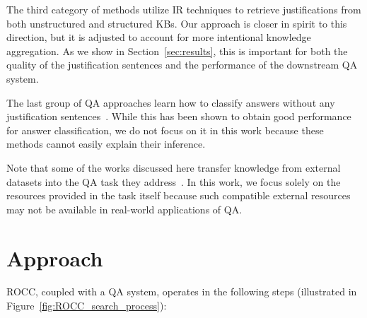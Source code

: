 The third category of methods utilize IR techniques to retrieve justifications from both unstructured \cite{yadav_AHE} and structured \cite{khashabi2016question} KBs. Our approach is closer in spirit to this direction, but it is adjusted to account for more intentional knowledge aggregation. As we show in Section~\ref{sec:results}, this is important for both the quality of the justification sentences and the performance of the downstream QA system.

The last group of QA approaches learn how to classify answers without any justification sentences~\cite{mihaylov2018can, sun2018improving, devlin2018bert}. While this has been shown to obtain good performance for answer classification, we do not focus on it in this work because these methods cannot easily explain their inference. 

Note that some of the works discussed here transfer knowledge from external datasets into the QA task they address~\cite{chung2017supervised, sun2018improving, pan2019improving, min2017question, qiu2018transfer, chen2017reading}. In this work, we focus solely on the resources provided in the task itself because such compatible external resources may not be available in real-world applications of QA. 

\section{Approach}

ROCC, coupled with a QA system, operates in the following steps (illustrated in Figure~\ref{fig:ROCC_search_process}):

